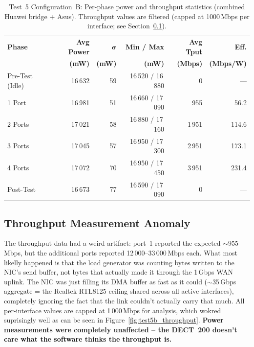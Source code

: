 \begin{table}[H]
    \centering
    \caption{Test~5 Configuration~B: Per-phase power and throughput statistics (combined Huawei bridge + Asus). Throughput values are filtered (capped at 1000\,Mbps per interface; see Section~\ref{sec:test5b-throughput-anomaly}).}
    \label{tab:test5b_stats}
    \small\renewcommand{\arraystretch}{0.88}
    \begin{tabular}{l r r r r r}
        \toprule
        \textbf{Phase} & \textbf{Avg Power} & $\boldsymbol{\sigma}$ & \textbf{Min / Max} & \textbf{Avg Tput} & \textbf{Eff.} \\
                       & \textbf{(mW)}      & \textbf{(mW)}        & \textbf{(mW)}      & \textbf{(Mbps)}   & \textbf{(Mbps/W)} \\
        \midrule
        Pre-Test (Idle) & 16\,632 & 59 & 16\,520 / 16\,880 & 0     & --- \\
        1 Port          & 16\,981 & 51 & 16\,660 / 17\,090 & 955   & 56.2 \\
        2 Ports         & 17\,021 & 58 & 16\,880 / 17\,160 & 1\,951 & 114.6 \\
        3 Ports         & 17\,045 & 57 & 16\,950 / 17\,300 & 2\,951 & 173.1 \\
        4 Ports         & 17\,072 & 70 & 16\,950 / 17\,450 & 3\,951 & 231.4 \\
        Post-Test       & 16\,673 & 77 & 16\,590 / 17\,090 & 0     & --- \\
        \bottomrule
    \end{tabular}
\end{table}

\subsection{Throughput Measurement Anomaly}
\label{sec:test5b-throughput-anomaly}

The throughput data had a weird artifact: port~1 reported the expected $\sim$955\,Mbps, but the additional ports reported 12\,000--33\,000\,Mbps each. What most likelly happened is that the load generator was counting bytes written to the \ac{NIC}'s send buffer, not bytes that actually made it through the 1\,Gbps WAN uplink. The \ac{NIC} was just filling its DMA buffer as fast as it could ($\sim$35\,Gbps aggregate = the Realtek RTL8125 ceiling shared across all active interfaces), completely ignoring the fact that the link couldn't actually carry that much.
All per-interface values are capped at 1\,000\,Mbps for analysis, which wokred suprisingly well as can be seen in Figure~\ref{fig:test5b_throughput}.
\textbf{Power measurements were completely unaffected -- the \ac{DECT}~200 doesn't care what the software thinks the throughput is.}

